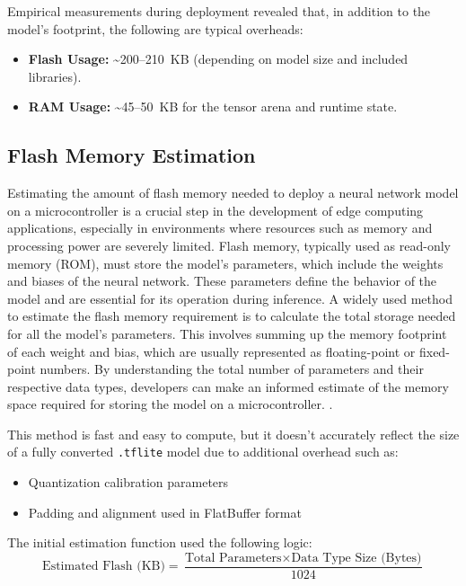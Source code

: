 Empirical measurements during deployment revealed that, in addition to the model's footprint, the following are typical overheads:

\begin{itemize}
    \item \textbf{Flash Usage:} \textasciitilde200--210~KB (depending on model size and included libraries).
    \item \textbf{RAM Usage:} \textasciitilde45--50~KB for the tensor arena and runtime state.
\end{itemize}


\subsection{Flash Memory Estimation}

Estimating the amount of flash memory needed to deploy a neural network model on a microcontroller is a crucial step in the development of edge computing applications, especially in environments where resources such as memory and processing power are severely limited. Flash memory, typically used as read-only memory (ROM), must store the model's parameters, which include the weights and biases of the neural network. These parameters define the behavior of the model and are essential for its operation during inference. A widely used method to estimate the flash memory requirement is to calculate the total storage needed for all the model's parameters. This involves summing up the memory footprint of each weight and bias, which are usually represented as floating-point or fixed-point numbers. By understanding the total number of parameters and their respective data types, developers can make an informed estimate of the memory space required for storing the model on a microcontroller. \cite{pau2023tiny}.

This method is fast and easy to compute, but it doesn't accurately reflect the size of a fully converted \texttt{.tflite} model due to additional overhead such as:
\begin{itemize}
    \item Quantization calibration parameters
    \item Padding and alignment used in FlatBuffer format \cite{manor2022custom}
\end{itemize}



The initial estimation function used the following logic:
\[
\text{Estimated Flash (KB)} = \frac{\text{Total Parameters} \times \text{Data Type Size (Bytes)}}{1024}
\]

